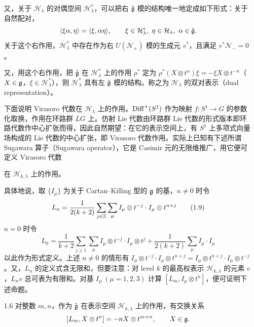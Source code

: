 又，关于 $\mathcal{H}_\lambda$ 的对偶空间 $\mathcal{H}_\lambda^*$，可以把右 $\hat{\mathfrak{g}}$ 模的结构唯一地定成如下形式：关于自然配对，
\[
  \langle\xi\alpha,\eta\rangle=\langle\xi,\alpha\eta\rangle,\qquad
  \xi\in\mathcal{H}_\lambda^*,\ \eta\in\mathcal{H}_\lambda,\ \alpha\in\hat{\fg}.
\]
关于这个右作用，$\mathcal{H}_\lambda^*$ 中存在作为右 $U(\mathcal{N}_+)$ 模的生成元 $v^*$，且满足 $v^*\mathcal{N}_-=0$。

又，用这个右作用，把 $\hat{\mathfrak{g}}$ 在 $\mathcal{H}_\lambda^*$ 上的作用 $\rho^*$ 定为 $\rho^*(X\otimes t^n)\xi=-\xi X\otimes t^{-n}$（$X\in\mathfrak{g}$，$\xi\in\mathcal{H}_\lambda^*$），则 $\mathcal{H}_\lambda^*$ 具有左 $\hat{\mathfrak{g}}$ 模的结构。称之为 $\mathcal{H}_\lambda$ 的双对表示（dual representation）。

下面说明 Virasoro 代数在 $\mathcal{H}_\lambda$ 上的作用。$\operatorname{Diff}^+(S^1)$ 作为映射 $f:S^1\to G$ 的参数化取换，作用在环路群 $LG$ 上。仿射 Lie 代数由环路群 Lie 代数的形式版本即环路代数作中心扩张而得，因此自然期望：在它的表示空间上，有 $S^1$ 上多项式向量场构成的 Lie 代数的中心扩张，即 Virasoro 代数作用。实际上已知有下述所谓 Sugawara 算子（Sugawara operator），它是 Casimir 元的无限维推广，用它便可定义 Virasoro 代数

在 $\mathcal{H}_{k,\lambda}$ 上的作用。

具体地说，取 $\{I_\mu\}$ 为关于 Cartan--Killing 型的 $\mathfrak{g}$ 的基，$n\ne0$ 时令
\begin{equation}
  L_n=\frac{1}{2(k+2)}\sum_{j\in\mathbb{Z}}\sum_\mu I_\mu\otimes t^{-j}\cdot I_\mu\otimes t^{n+j} \tag{1.9}
\end{equation}
$n=0$ 时令
\begin{equation}
  L_0=\frac{1}{k+2}\sum_{j\ge 1}\sum_\mu I_\mu\otimes t^{-j}\cdot I_\mu\otimes t^{j}+\frac{1}{2(k+2)}\sum_\mu I_\mu\cdot I_\mu \tag{1.10}
\end{equation}
以此作为形式定义。上述 $n\ne0$ 的情形有 $I_\mu\otimes t^{-j}\cdot I_\mu\otimes t^{n+j}=I_\mu\otimes t^{n+j}\cdot I_\mu\otimes t^{-j}$。又，$L_n$ 的定义式含无限和，但要注意：对 level $k$ 的最高权表示 $\mathcal{H}_{k,\lambda}$ 的元素 $v$，$L_nv$ 总可表为有限和。对基 $I_\mu\ (\mu=1,2,3)$ 计算 $[L_m,I_\mu\otimes t^n]$，便可证明下述命题。


\begin{proposition}{1.6}
对整数 $m,n$，作为 $\hat{\mathfrak{g}}$ 在表示空间 $\mathcal{H}_{k,\lambda}$ 上的作用，有交换关系
\[
  [L_m,X\otimes t^n]=-nX\otimes t^{m+n},\qquad X\in\mathfrak{g} .
\]
\end{proposition}

